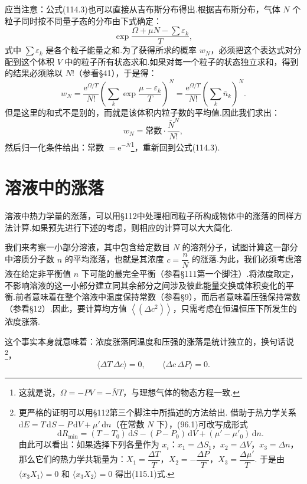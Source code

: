 应当注意：公式(114.3)也可以直接从吉布斯分布得出.根据吉布斯分布，气体 $N$ 个粒子同时按不同量子态的分布由下式确定：
\begin{equation*}
  \exp\frac{\Omega+\mu N-\sum\varepsilon_{k}}{T},
\end{equation*}
式中 $\sum\varepsilon_{k}$ 是各个粒子能量之和.为了获得所求的概率 $w_{N}$，必须把这个表达式对分配到这个体积 $V$ 中的粒子所有状态求和.如果对每一个粒子的状态独立求和，得到的结果必须除以 $N$!（参看§41），于是得：
\begin{equation*}
  w_{N}=\frac{\mathrm{e}^{\Omega/T}}{N!}
  \left(\sum_{k}\exp\frac{\mu-\varepsilon_{k}}{T}\right)^{N}
  =\frac{\mathrm{e}^{\Omega/T}}{N!}
  \left(\sum_{k}\bar{n}_{k}\right)^{N}.
\end{equation*}
但是这里的和式不是别的，而就是该体积内粒子数的平均值.因此我们求出：
\begin{equation*}
  w_{N}=\text{常数}\cdot\frac{\bar{N}^{N}}{N!},
\end{equation*}
然后归一化条件给出：常数 $=\mathrm{e}^{-\bar{N}}$\footnote{这就是说，$\Omega=-PV=-\bar{N}T$，与理想气体的物态方程一致.}，重新回到公式(114.3).

\section{溶液中的涨落}

溶液中热力学量的涨落，可以用§112中处理相同粒子所构成物体中的涨落的同样方法计算.如果预先进行下述的考虑，则相应的计算可以大大简化.

我们来考察一小部分溶液，其中包含给定数目 $N$ 的溶剂分子，试图计算这一部分中溶质分子数
$n$ 的平均涨落，也就是其浓度 $c=\dfrac{n}{N}$ 的涨落.为此，我们必须考虑溶液在给定非平衡值
$n$ 下可能的最完全平衡（参看§111第一个脚注）.将浓度取定，不影响溶液的这一小部分建立同其余部分之间涉及彼此能量交换或体积变化的平衡.前者意味着在整个溶液中温度保持常数（参看§9），而后者意味着压强保持常数（参看§12）.因此，要计算均方值
$\left\langle(\Delta c^{2})\right\rangle$，只需考虑在恒温恒压下所发生的浓度涨落.

这个事实本身就意味着：浓度涨落同温度和压强的涨落是统计独立的，换句话说\footnote{更严格的证明可以用§112第三个脚注中所描述的方法给出. 借助于热力学关系 $\mathrm{d}E=T\,\mathrm{d}S-P\,\mathrm{d}V+\mu'\,\mathrm{d}n$（在常数 $N$ 下），(96.1)可改写成形式
\begin{equation*}
  \mathrm{d}R_{\mathrm{min}}=(T-T_{0})\,\mathrm{d}S
  -(P-P_{0})\,\mathrm{d}V+(\mu'-\mu'_{0})\,\mathrm{d}n.
\end{equation*}
由此可以看出：如果选择下列各量作为 $x_{i}$：$x_{1}=\Delta S_{1}$，$x_{2}=\Delta V$，$x_{3}=\Delta n$，那么它们的热力学共轭量为：$X_{1}=\dfrac{\Delta T}{T}$，$X_{2}=-\dfrac{\Delta P}{T}$，$X_{3}=\dfrac{\Delta\mu'}{T}$. 于是由 $\langle x_{3}X_{1}\rangle=0$ 和 $\langle x_{3}X_{2}\rangle=0$ 得出(115.1)式.}，
\begin{equation}
  \langle\Delta T\,\Delta c\rangle=0,\qquad
  \langle\Delta c\,\Delta P\rangle=0.
\end{equation}

